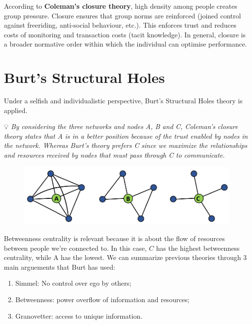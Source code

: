 \documentclass[
  notitlepage,
  onecolumn,
  openany]{book}
\providecommand{\tightlist}{%
  \setlength{\itemsep}{0pt}\setlength{\parskip}{0pt}}
\begin{document}
According to \textbf{Coleman's closure theory}, high density among people
creates group pressure. Closure ensures that group norms are reinforced
(joined control against freeriding, anti-social behaviour, etc.). This
enforces trust and reduces costs of monitoring and transaction costs
(tacit knowledge). In general, closure is a broader normative order
within which the individual can optimise performance.

\hypertarget{burts-structural-holes}{%
\section{Burt's Structural Holes}\label{burts-structural-holes}}

Under a selfish and individualistic perspective, Burt's Structural Holes
theory is applied.

💡 \emph{By considering the three networks and nodes A, B and C, Coleman's
closure theory states that A is in a better position because of the
trust enabled by nodes in the network. Whereas Burt's theory prefers C
since we maximize the relationships and resources received by nodes that
must pass through C to communicate.}

\begin{figure}[h!]

{\centering \includegraphics[width=0.5\linewidth]{images/07-Triads and structural holes/Untitled 2} 

}

\end{figure}

Betweenness centrality is relevant because it is about the flow of
resources between people we're connected to. In this case, \(C\) has the
highest betweenness centrality, while A has the lowest. We can summarize
previous theories through \(3\) main arguements that Burt has used:

\begin{enumerate}
\def\labelenumi{\arabic{enumi}.}
\tightlist
\item
  Simmel: No control over ego by others;
\item
  Betweenness: power overflow of information and resources;
\item
  Granovetter: access to unique information.
\end{enumerate}
\end{document}
